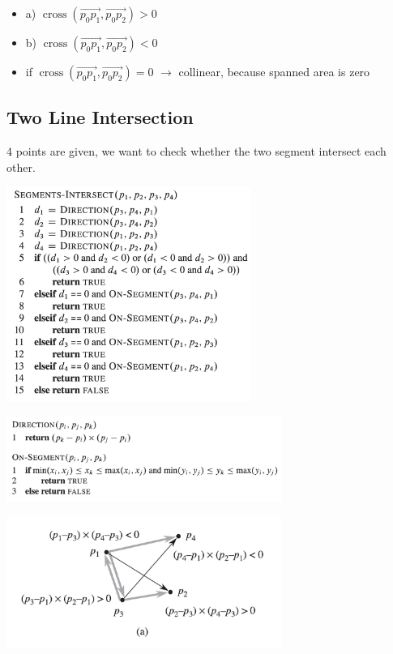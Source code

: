 \documentclass[10pt,a4paper,twocolumn]{article}
\begin{document}
\begin{itemize}
	\item a) $\operatorname{cross}\left(\overrightarrow{p_{0} p_{1}}, \overrightarrow{p_{0} p_{2}}\right)>0$
	\item b) $\operatorname{cross}\left(\overrightarrow{p_{0} p_{1}}, \overrightarrow{p_{0} p_{2}}\right)<0$
	\item if $\operatorname{cross}\left(\overrightarrow{p_{0} p_{1}}, \overrightarrow{p_{0} p_{2}}\right)=0$ $\rightarrow$ collinear, because spanned area is zero 
\end{itemize}

\subsection{Two Line Intersection}
4 points are given, we want to check whether the two segment intersect each other.

\begin{center}
	\includegraphics[width=8cm]{images/segment-intersection1}
\end{center}
\begin{center}
	\includegraphics[width=9cm]{images/segment-intersection2}
\end{center}

\begin{center}
	\includegraphics[width=9cm]{images/line-intersection-examplea}
\end{center}
\end{document}
